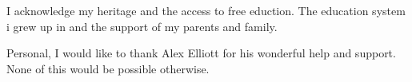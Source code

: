 I acknowledge my heritage and the access to free eduction.
The education system i grew up in and the support of my parents and family.

Personal, I would like to thank Alex Elliott for his wonderful help and support. None of this would be possible otherwise.




